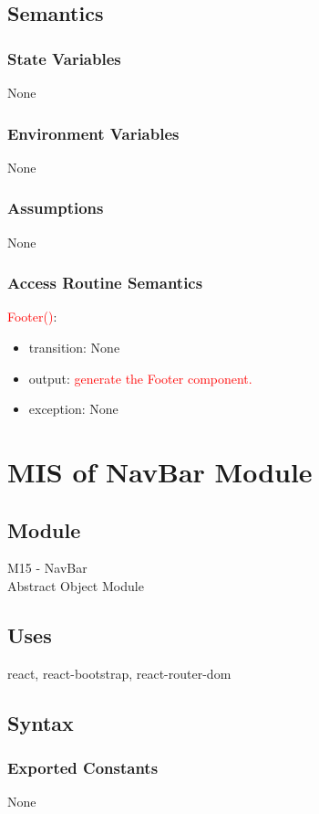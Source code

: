 \documentclass[12pt, titlepage]{article}
\begin{document}
\subsection{Semantics}

\subsubsection{State Variables}
None

\subsubsection{Environment Variables}
None

\subsubsection{Assumptions}
None

\subsubsection{Access Routine Semantics}

\noindent \textcolor{red}{Footer()}:
\begin{itemize}
\item transition: None 
\item output: \textcolor{red}{generate the Footer component.}
\item exception: None
\end{itemize}

\newpage


\section{MIS of NavBar Module} \label{Module} 
\subsection{Module}
M15 - NavBar\\
Abstract Object Module

\subsection{Uses}
react, react-bootstrap, react-router-dom

\subsection{Syntax}
\subsubsection{Exported Constants}
None
\end{document}
